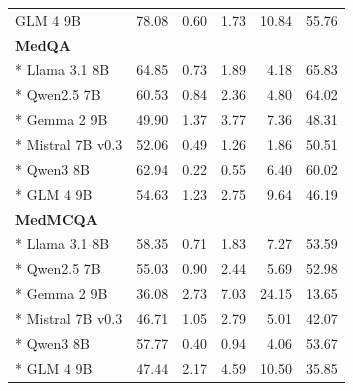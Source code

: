 \begin{longtable}{lrrrrr}
GLM 4 9B & 78.08 & 0.60 & 1.73 & 10.84 & 55.76\\
\multicolumn{6}{l}{\textbf{MedQA}}\\*
Llama 3.1 8B & 64.85 & 0.73 & 1.89 & 4.18 & 65.83\\*
Qwen2.5 7B & 60.53 & 0.84 & 2.36 & 4.80 & 64.02\\*
Gemma 2 9B & 49.90 & 1.37 & 3.77 & 7.36 & 48.31\\*
Mistral 7B v0.3 & 52.06 & 0.49 & 1.26 & 1.86 & 50.51\\*
Qwen3 8B & 62.94 & 0.22 & 0.55 & 6.40 & 60.02\\*
GLM 4 9B & 54.63 & 1.23 & 2.75 & 9.64 & 46.19\\
\multicolumn{6}{l}{\textbf{MedMCQA}}\\*
Llama 3.1 8B & 58.35 & 0.71 & 1.83 & 7.27 & 53.59\\*
Qwen2.5 7B & 55.03 & 0.90 & 2.44 & 5.69 & 52.98\\*
Gemma 2 9B & 36.08 & 2.73 & 7.03 & 24.15 & 13.65\\*
Mistral 7B v0.3 & 46.71 & 1.05 & 2.79 & 5.01 & 42.07\\*
Qwen3 8B & 57.77 & 0.40 & 0.94 & 4.06 & 53.67\\*
GLM 4 9B & 47.44 & 2.17 & 4.59 & 10.50 & 35.85\\
\end{longtable}\endgroup
